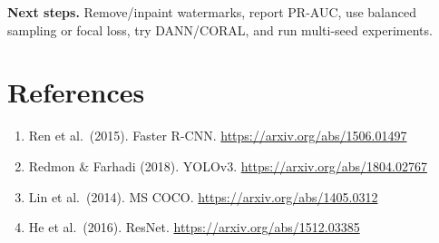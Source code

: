 \documentclass[10pt,twocolumn]{article}
\begin{document}
\textbf{Next steps.} Remove/inpaint watermarks, report PR-AUC, use balanced sampling or focal loss, try DANN/CORAL, and run multi-seed experiments.

\section*{References}
{\footnotesize
\begin{enumerate}[leftmargin=*, itemsep=0pt, topsep=2pt]
\item Ren et al.\ (2015). Faster R-CNN. \url{https://arxiv.org/abs/1506.01497}
\item Redmon \& Farhadi (2018). YOLOv3. \url{https://arxiv.org/abs/1804.02767}
\item Lin et al.\ (2014). MS COCO. \url{https://arxiv.org/abs/1405.0312}
\item He et al.\ (2016). ResNet. \url{https://arxiv.org/abs/1512.03385}
\end{enumerate}
}
\end{document}
